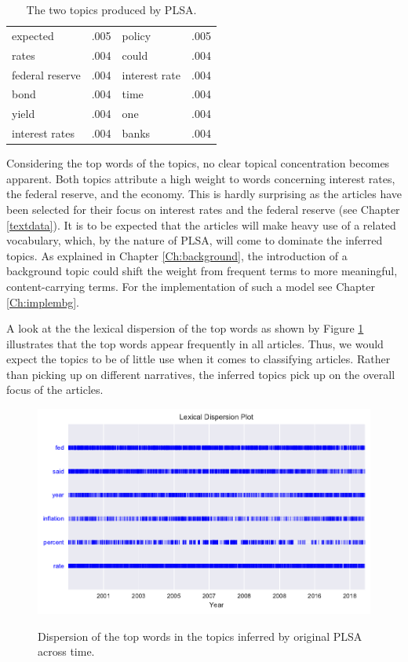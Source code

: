\documentclass[11pt,a4paper,english,oneside]{book}
\numberwithin{equation}{chapter}
\begin{document}
\begin{table}[h]
\begin{tabular}{ p{3cm}  p{2cm}  p{3cm}  p{2cm} }
		expected		 & .005 & policy			& .005  \\
		rates			 & .004 & could				& .004  \\
		federal	reserve	 & .004 & interest rate		& .004  \\
		bond			 & .004 & time				& .004  \\
		yield			 & .004 & one				& .004  \\
		interest rates   & .004 & banks				& .004  \\
		\bottomrule %
	\end{tabular}
	\caption{The two topics produced by PLSA.} %
	\label{tab:topic1} %
\end{table}

Considering the top words of the topics, no clear topical concentration becomes apparent. Both topics attribute a high weight to words concerning interest rates, the federal reserve, and the economy. This is hardly surprising as the articles have been selected for their focus on interest rates and the federal reserve (see Chapter \ref{textdata}). It is to be expected that the articles will make heavy use of a related vocabulary, which, by the nature of PLSA, will come to dominate the inferred topics. As explained in Chapter \ref{Ch:background}, the introduction of a background topic could shift the weight from frequent terms to more meaningful, content-carrying terms. For the implementation of such a model see Chapter \ref{Ch:implembg}.

A look at the the lexical dispersion of the top words as shown by Figure \ref{dispersionPLSAorig} illustrates that the top words appear frequently in all articles. Thus, we would expect the topics to be of little use when it comes to classifying articles. Rather than picking up on different narratives, the inferred topics pick up on the overall focus of the articles. 

\begin{figure}
	\caption{Dispersion of the top words in the topics inferred by original PLSA across time.}
	\centering
	\includegraphics[scale=1]{Images/dispersionplot_topicPLSAorig.pdf}
	\label{dispersionPLSAorig}
\end{figure}
\end{document}
